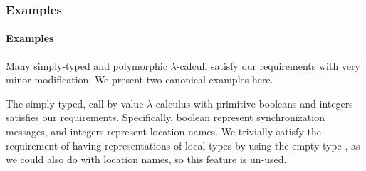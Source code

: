 \iftr\subsubsection{Examples}\else\paragraph{Examples}\fi
\label{sec:loc-lang-examples}
Many simply-typed and polymorphic $\lambda$-calculi satisfy our requirements with very minor modification.
We present two canonical examples here.

\begin{ex}
  \label{ex:st-lambda}
  The simply-typed, call-by-value $\lambda$-calculus with primitive booleans and integers satisfies our requirements.
  Specifically, boolean represent synchronization messages, and integers represent location names.
  We trivially satisfy the requirement of having representations of local types by using the empty type \Empty, as we could also do with location names, so this feature is un-used.

  
  \begin{syntax}
  	 \alternative{\Int} \alternative{\Bool} \alternative{\Empty} 
       \\
      \\
    \alternative{\True} \alternative{\False} 
  \end{syntax}
\end{ex}


